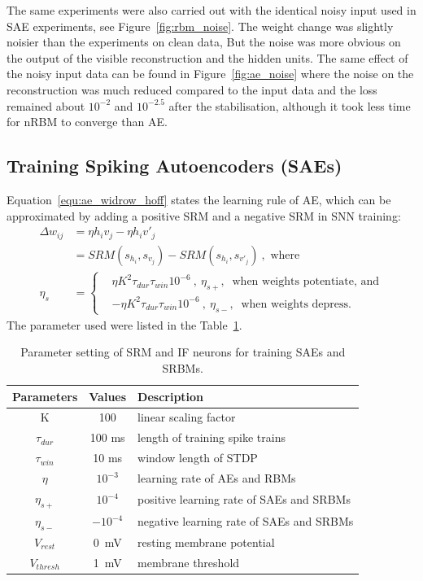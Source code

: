 The same experiments were also carried out with the identical noisy input used in SAE experiments, see Figure~\ref{fig:rbm_noise}.
The weight change was slightly noisier than the experiments on clean data, But the noise was more obvious on the output of the visible reconstruction and the hidden units.
The same effect of the noisy input data can be found in Figure~\ref{fig:ae_noise} where the noise on the reconstruction was much reduced compared to the input data and the loss remained about $10^{-2}$ and $10^{-2.5}$ after the stabilisation, although it took less time for nRBM to converge than AE.


\subsection{Training Spiking Autoencoders (SAEs)}
\label{subsec:SAE}
Equation~\ref{equ:ae_widrow_hoff} states the learning rule of AE, which can be approximated by adding a positive SRM and a negative SRM in SNN training:
\begin{equation}
\label{equ:sae}
\begin{aligned}
\Delta w_{ij} &= \eta h_i v_j - \eta h_i v'_j \\
&= SRM(s_{h_i}, s_{v_j}) - SRM(s_{h_i}, s_{v'_j})~, \textrm{~where}\\
\eta_{s}&=\left \{
\begin{aligned}
 &\eta K^2 \tau_{dur} \tau_{win}10^{-6}~, ~\eta_{s+},~\textrm{~when weights potentiate,~and}\\
 & -\eta K^2 \tau_{dur} \tau_{win}10^{-6}~, ~\eta_{s-},~\textrm{~when weights depress.}
 \end{aligned} 
 \right.
\end{aligned} 
\end{equation}
The parameter used were listed in the Table~\ref{tbl:srm}.
\begin{table}[th]
	\centering
	\caption{\label{tbl:srm}Parameter setting of SRM and IF neurons for training SAEs and SRBMs.}
	\bgroup
	\def\arraystretch{1.2}
	\begin{tabular}{c c l}
		Parameters & Values & Description \\
		\hline
		K & 100 & linear scaling factor\\
		$\tau_{dur}$ & 100 ms &  length of training spike trains\\
		$\tau_{win}$ & 10 ms & window length of STDP\\
		$\eta$ & $10^{-3}$ & learning rate of AEs and RBMs\\
		$\eta_{s+}$ & $10^{-4}$ & positive learning rate of SAEs and SRBMs\\
		$\eta_{s-}$ & $-10^{-4}$ & negative learning rate of SAEs and SRBMs\\
		$V_{rest}$ & 0~mV & resting membrane potential\\
		$V_{thresh}$ & 1~mV & membrane threshold  \\
	\end{tabular}
	\egroup
\end{table}

